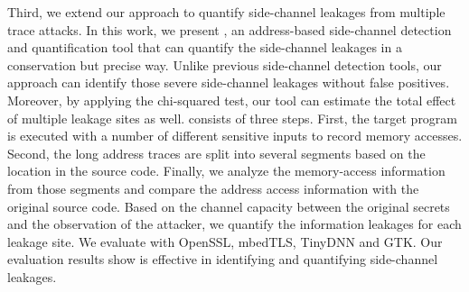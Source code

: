 Third, we extend our approach to quantify side-channel leakages from multiple trace attacks. In this work, we present \ctool{}, an address-based side-channel detection and quantification tool that can quantify the side-channel leakages in a conservation but precise way. Unlike previous side-channel detection tools, our approach can identify those severe side-channel leakages without false positives. Moreover, by applying the chi-squared test, our tool can estimate the total effect of multiple leakage sites as well. \ctool{} consists of three steps. First, the target program is executed with a number of different sensitive inputs to record memory accesses. Second, the long address traces are split into several segments based on the location in the source code. Finally, we analyze the memory-access information from those segments and compare the address access information with the original source code. Based on the channel capacity between the original secrets and the observation of the attacker, we quantify the information leakages for each leakage site. We evaluate \ctool{} with OpenSSL, mbedTLS, TinyDNN and GTK. Our evaluation results show \ctool{} is effective in identifying and quantifying side-channel leakages.
